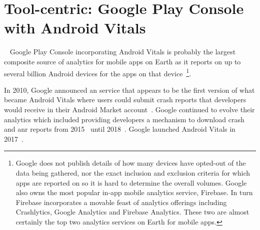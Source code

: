 \section{Tool-centric: Google Play Console with Android Vitals}~\label{case-study-overview-google-play-console-with-android-vitals}
Google Play Console incorporating Android Vitals is probably the largest composite source of analytics for mobile apps on Earth as it reports on up to several billion Android devices for the apps on that device~\footnote{Google does not publish details of how many devices have opted-out of the data being gathered, nor the exact inclusion and exclusion criteria for which apps are reported on so it is hard to determine the overall volumes. Google also owns the most popular in-app mobile analytics service, Firebase. In turn Firebase incorporates a movable feast of analytics offerings including Crashlytics, Google Analytics and Firebase Analytics. These two are almost certainly the top two analytics services on Earth for mobile apps.}.

In 2010, Google announced an service that appears to be the first version of what became Android Vitals where users could submit crash reports that developers would receive in their Android Market account~. Google continued to evolve their analytics which included providing developers a mechanism to download crash and \acrshort{anr} reports from 2015~ until 2018~. Google launched Android Vitals in 2017~.

